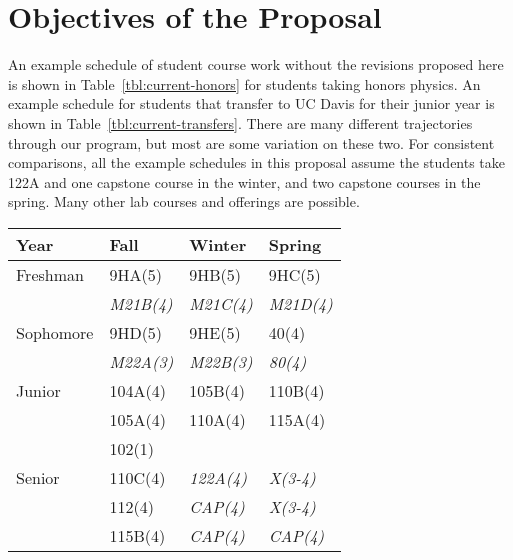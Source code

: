 \documentclass[12pt]{article}
\begin{document}
\newpage

\section{Objectives of the Proposal}

An example schedule of student course work without the revisions
proposed here is shown in Table~\ref{tbl:current-honors} for students
taking honors physics.  An example schedule for students that transfer
to UC Davis for their junior year is shown in
Table~\ref{tbl:current-transfers}.  There are many different
trajectories through our program, but most are some variation on these
two.  For consistent comparisons, all the example schedules in this
proposal assume the students take 122A and one capstone course in the
winter, and two capstone courses in the spring.  Many other lab
courses and offerings are possible.

\begin{center}
\begin{tabular}{|l|l|l|l|}
\hline
Year      & Fall    & Winter & Spring \\
\hline
Freshman  & 9HA(5)     & 9HB(5)     & 9HC(5) \\
          & {\it M21B(4)}  & {\it M21C(4)}  & {\it M21D(4)} \\
\hline
Sophomore & 9HD(5)     & 9HE(5)     & 40(4)     \\
          & {\it M22A(3)}     & {\it M22B(3)} & {\it 80(4)} \\
\hline
Junior    & 104A(4) & 105B(4) & 110B(4)\\
          & 105A(4) & 110A(4) & 115A(4)\\
          & 102(1)  &    &     \\
\hline
Senior    & 110C(4) & {\it 122A(4)} & {\it X(3-4)}\\
          & 112(4)  & {\it CAP(4)}   & {\it X(3-4)}\\
          & 115B(4) & {\it CAP(4)}   & {\it CAP(4)}\\

\hline 
\end{tabular}
\end{center}
\end{document}
